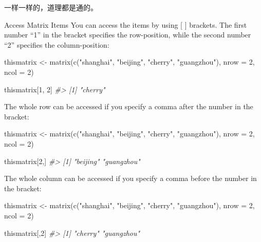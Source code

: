 \documentclass[
]{book}
\newenvironment{Shaded}{\begin{snugshade}}{\end{snugshade}}
\newcommand{\AttributeTok}[1]{\textcolor[rgb]{0.77,0.63,0.00}{#1}}
\newcommand{\CommentTok}[1]{\textcolor[rgb]{0.56,0.35,0.01}{\textit{#1}}}
\newcommand{\DecValTok}[1]{\textcolor[rgb]{0.00,0.00,0.81}{#1}}
\newcommand{\FunctionTok}[1]{\textcolor[rgb]{0.00,0.00,0.00}{#1}}
\newcommand{\NormalTok}[1]{#1}
\newcommand{\OtherTok}[1]{\textcolor[rgb]{0.56,0.35,0.01}{#1}}
\newcommand{\StringTok}[1]{\textcolor[rgb]{0.31,0.60,0.02}{#1}}
\begin{document}
一样一样的，道理都是通的。

Access Matrix Items
You can access the items by using {[} {]} brackets. The first number ``1'' in the bracket specifies the row-position, while the second number ``2'' specifies the column-position:

\begin{Shaded}
\begin{Highlighting}[]
\NormalTok{thismatrix }\OtherTok{\textless{}{-}} \FunctionTok{matrix}\NormalTok{(}\FunctionTok{c}\NormalTok{(}\StringTok{"shanghai"}\NormalTok{, }\StringTok{"beijing"}\NormalTok{, }\StringTok{"cherry"}\NormalTok{, }\StringTok{"guangzhou"}\NormalTok{), }\AttributeTok{nrow =} \DecValTok{2}\NormalTok{, }\AttributeTok{ncol =} \DecValTok{2}\NormalTok{)}

\NormalTok{thismatrix[}\DecValTok{1}\NormalTok{, }\DecValTok{2}\NormalTok{]}
\CommentTok{\#\textgreater{} [1] "cherry"}
\end{Highlighting}
\end{Shaded}

The whole row can be accessed if you specify a comma after the number in the bracket:

\begin{Shaded}
\begin{Highlighting}[]
\NormalTok{thismatrix }\OtherTok{\textless{}{-}} \FunctionTok{matrix}\NormalTok{(}\FunctionTok{c}\NormalTok{(}\StringTok{"shanghai"}\NormalTok{, }\StringTok{"beijing"}\NormalTok{, }\StringTok{"cherry"}\NormalTok{, }\StringTok{"guangzhou"}\NormalTok{), }\AttributeTok{nrow =} \DecValTok{2}\NormalTok{, }\AttributeTok{ncol =} \DecValTok{2}\NormalTok{)}

\NormalTok{thismatrix[}\DecValTok{2}\NormalTok{,]}
\CommentTok{\#\textgreater{} [1] "beijing"   "guangzhou"}
\end{Highlighting}
\end{Shaded}

The whole column can be accessed if you specify a comma before the number in the bracket:

\begin{Shaded}
\begin{Highlighting}[]
\NormalTok{thismatrix }\OtherTok{\textless{}{-}} \FunctionTok{matrix}\NormalTok{(}\FunctionTok{c}\NormalTok{(}\StringTok{"shanghai"}\NormalTok{, }\StringTok{"beijing"}\NormalTok{, }\StringTok{"cherry"}\NormalTok{, }\StringTok{"guangzhou"}\NormalTok{), }\AttributeTok{nrow =} \DecValTok{2}\NormalTok{, }\AttributeTok{ncol =} \DecValTok{2}\NormalTok{)}

\NormalTok{thismatrix[,}\DecValTok{2}\NormalTok{]}
\CommentTok{\#\textgreater{} [1] "cherry"    "guangzhou"}
\end{Highlighting}
\end{Shaded}
\end{document}

